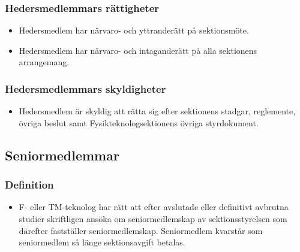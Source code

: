 \documentclass[11pt,a4paper]{article}
\begin{document}
\subsubsection{Hedersmedlemmars rättigheter}

\begin{itemize}

   \item Hedersmedlem har närvaro- och yttranderätt på sektionsmöte.

   \item Hedersmedlem har närvaro- och intaganderätt på alla sektionens
arrangemang.

\end{itemize}

\subsubsection{Hedersmedlemmars skyldigheter}

\begin{itemize}


\item Hedersmedlem är skyldig att rätta sig efter sektionens stadgar,
   regle\-mente, övriga beslut samt  Fysikteknologsektionens övriga styrdokument.
   
\end{itemize}




\subsection{Seniormedlemmar}

\subsubsection{Definition}

\begin{itemize}

  \item F- eller TM-teknolog har rätt att efter avslutade eller definitivt
  avbrutna studier skriftligen ansöka om seniormedlemskap av sektionsstyrelsen
  som därefter fastställer seniormedlemskap. Seniormedlem kvarstår som
  senior\-med\-lem så länge sektionsavgift betalas.

\end{itemize}
\end{document}
